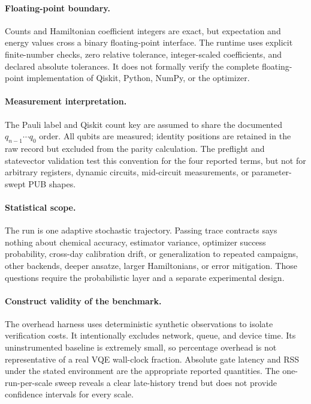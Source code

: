 \paragraph{Floating-point boundary.}
Counts and Hamiltonian coefficient integers are exact, but expectation and
energy values cross a binary floating-point interface.  The runtime uses
explicit finite-number checks, zero relative tolerance, integer-scaled
coefficients, and declared absolute tolerances.  It does not formally verify
the complete floating-point implementation of Qiskit, Python, NumPy, or the
optimizer.

\paragraph{Measurement interpretation.}
The Pauli label and Qiskit count key are assumed to share the documented
$q_{n-1}\cdots q_0$ order.  All qubits are measured; identity positions are
retained in the raw record but excluded from the parity calculation.  The
preflight and statevector validation test this convention for the four
reported terms, but not for arbitrary registers, dynamic circuits, mid-circuit
measurements, or parameter-swept PUB shapes.

\paragraph{Statistical scope.}
The run is one adaptive stochastic trajectory.  Passing trace contracts says
nothing about chemical accuracy, estimator variance, optimizer success
probability, cross-day calibration drift, or generalization to repeated
campaigns, other backends, deeper ansatze, larger Hamiltonians, or error
mitigation.  Those questions require the probabilistic layer and a separate
experimental design.

\paragraph{Construct validity of the benchmark.}
The overhead harness uses deterministic synthetic observations to isolate
verification costs.  It intentionally excludes network, queue, and device
time.  Its uninstrumented baseline is extremely small, so percentage overhead
is not representative of a real VQE wall-clock fraction.  Absolute gate
latency and RSS under the stated environment are the appropriate reported
quantities.  The one-run-per-scale sweep reveals a clear late-history trend but
does not provide confidence intervals for every scale.

